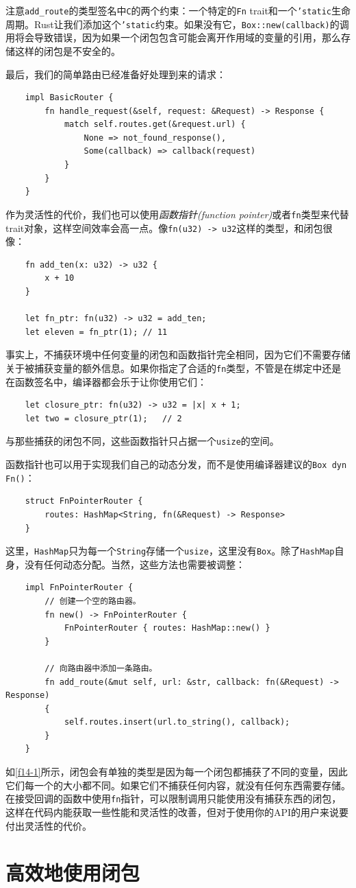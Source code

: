 \begin{note}
    注意\texttt{add\_route}的类型签名中\texttt{C}的两个约束：一个特定的\texttt{Fn} trait和一个\texttt{'static}生命周期。Rust让我们添加这个\texttt{'static}约束。如果没有它，\texttt{Box::new(callback)}的调用将会导致错误，因为如果一个闭包包含可能会离开作用域的变量的引用，那么存储这样的闭包是不安全的。
\end{note}

最后，我们的简单路由已经准备好处理到来的请求：
\begin{verbatim}
    impl BasicRouter {
        fn handle_request(&self, request: &Request) -> Response {
            match self.routes.get(&request.url) {
                None => not_found_response(),
                Some(callback) => callback(request)
            }
        }
    }
\end{verbatim}

作为灵活性的代价，我们也可以使用\emph{函数指针(function pointer)}或者\texttt{fn}类型来代替trait对象，这样空间效率会高一点。像\texttt{fn(u32) -> u32}这样的类型，和闭包很像：
\begin{verbatim}
    fn add_ten(x: u32) -> u32 {
        x + 10
    }

    let fn_ptr: fn(u32) -> u32 = add_ten;
    let eleven = fn_ptr(1); // 11
\end{verbatim}

事实上，不捕获环境中任何变量的闭包和函数指针完全相同，因为它们不需要存储关于被捕获变量的额外信息。如果你指定了合适的\texttt{fn}类型，不管是在绑定中还是在函数签名中，编译器都会乐于让你使用它们：
\begin{verbatim}
    let closure_ptr: fn(u32) -> u32 = |x| x + 1;
    let two = closure_ptr(1);   // 2
\end{verbatim}

与那些捕获的闭包不同，这些函数指针只占据一个\texttt{usize}的空间。

函数指针也可以用于实现我们自己的动态分发，而不是使用编译器建议的\texttt{Box dyn Fn()}：
\begin{verbatim}
    struct FnPointerRouter {
        routes: HashMap<String, fn(&Request) -> Response>
    }
\end{verbatim}

这里，\texttt{HashMap}只为每一个\texttt{String}存储一个\texttt{usize}，这里没有\texttt{Box}。除了\texttt{HashMap}自身，没有任何动态分配。当然，这些方法也需要被调整：
\begin{verbatim}
    impl FnPointerRouter {
        // 创建一个空的路由器。
        fn new() -> FnPointerRouter {
            FnPointerRouter { routes: HashMap::new() }
        }

        // 向路由器中添加一条路由。
        fn add_route(&mut self, url: &str, callback: fn(&Request) -> Response)
        {
            self.routes.insert(url.to_string(), callback);
        }
    }
\end{verbatim}

如\autoref{f14-1}所示，闭包会有单独的类型是因为每一个闭包都捕获了不同的变量，因此它们每一个的大小都不同。如果它们不捕获任何内容，就没有任何东西需要存储。在接受回调的函数中使用\texttt{fn}指针，可以限制调用只能使用没有捕获东西的闭包，这样在代码内能获取一些性能和灵活性的改善，但对于使用你的API的用户来说要付出灵活性的代价。

\section{高效地使用闭包}



